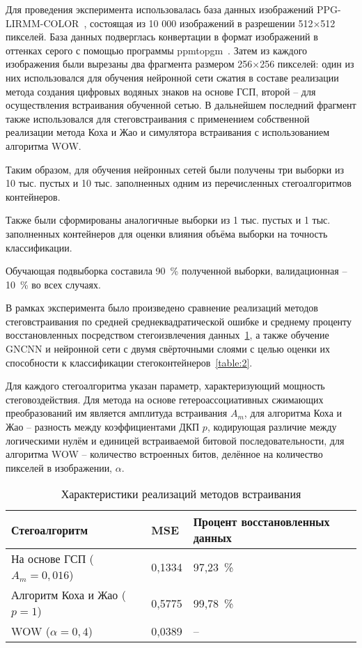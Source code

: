 Для проведения эксперимента использовалась база данных изображений PPG-LIRMM-COLOR~\cite{PPG-LIRMM-COLOR}, состоящая из 10 000 изображений в разрешении 512×512 пикселей. База данных подверглась конвертации в формат изображений в оттенках серого с помощью программы ppmtopgm~\cite{ppmtopgm}. Затем из каждого изображения были вырезаны два фрагмента размером 256×256 пикселей: один из них использовался для обучения нейронной сети сжатия в составе реализации метода создания цифровых водяных знаков на основе ГСП, второй – для осуществления встраивания обученной сетью. В дальнейшем последний фрагмент также использовался для стеговстраивания с применением собственной реализации метода Коха и Жао и симулятора встраивания с использованием алгоритма WOW.

Таким образом, для обучения нейронных сетей были получены три выборки из 10 тыс. пустых и 10 тыс. заполненных одним из перечисленных стегоалгоритмов контейнеров.

Также были сформированы аналогичные выборки из 1 тыс. пустых и 1 тыс. заполненных контейнеров для оценки влияния объёма выборки на точность классификации.

Обучающая подвыборка составила 90~\% полученной выборки, валидационная – 10~\% во всех случаях.

В рамках эксперимента было произведено сравнение реализаций методов стеговстраивания по средней среднеквадратической ошибке и среднему проценту восстановленных посредством стегоизвлечения данных~\ref{table:1}, а также обучение GNCNN и нейронной сети с двумя свёрточными слоями с целью оценки их способности к классификации стегоконтейнеров~\ref{table:2}.

Для каждого стегоалгоритма указан параметр, характеризующий мощность стеговоздействия. Для метода на основе гетероассоциативных сжимающих преобразований им является амплитуда встраивания $ A_m $, для алгоритма Коха и Жао – разность между коэффициентами ДКП $ p $, кодирующая различие между логическими нулём и единицей встраиваемой битовой последовательности, для алгоритма WOW – количество встроенных битов, делённое на количество пикселей в изображении, $ \alpha $.

\begin{table}[h!]
\centering
    \begin{tabular}{| l | l | l |}
    \hline
    Стегоалгоритм & MSE & Процент восстановленных данных \\ \hline
    На основе ГСП ($ A_m = 0,016 $) & 0,1334 & 97,23~\% \\ \hline
    Алгоритм Коха и Жао ($ p = 1 $) & 0,5775 & 99,78~\% \\ \hline
    WOW ($ \alpha = 0,4 $) & 0,0389 & – \\ \hline
    \end{tabular}
\caption{Характеристики реализаций методов встраивания}
\label{table:1}
\end{table}

